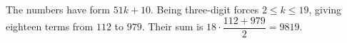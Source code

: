 The numbers have form $51k+10$. Being three-digit forces $2\le k\le19$, giving eighteen terms from $112$ to $979$. Their sum is $18\cdot\dfrac{112+979}{2}=\boxed{9819}$.
